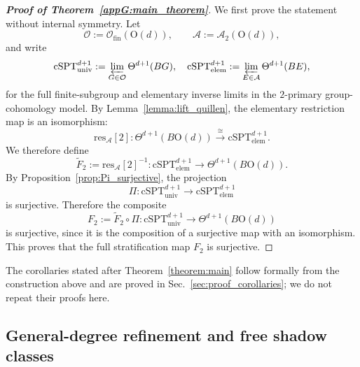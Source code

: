 \documentclass[aps,prx,reprint,superscriptaddress,twocolumn,amsmath,amssymb,amsfonts, nofootinbib]{revtex4-2}
\newcommand{\res}{\text{res}}
\theoremstyle{apsstyle}
\begin{document}
\begin{proof}[\textnormal{\textbf{Proof of Theorem~\ref{appG:main_theorem}}}]
We first prove the statement without internal symmetry. Let
\begin{equation}
\mathcal O:=\mathcal O_{\mathrm{fin}}(\mathrm{O}(d)), \qquad \mathcal A:=\mathcal A_2(\mathrm{O}(d)),
\end{equation}
and write
\begin{equation}
\mathrm{cSPT}^{d+1}_{\mathrm{univ}} := \varprojlim_{G\in\mathcal O}\Theta^{d+1}(BG),
\quad
\mathrm{cSPT}^{d+1}_{\mathrm{elem}} := \varprojlim_{E\in\mathcal A}\Theta^{d+1}(BE),
\end{equation}
for the full finite-subgroup and elementary inverse limits in the $2$-primary group-cohomology model. By Lemma~\ref{lemma:lift_quillen}, the elementary restriction map is an isomorphism:
\begin{equation}
\res_{\mathcal A}[2]:
\Theta^{d+1}(B\mathrm{O}(d)) \xrightarrow{\;\cong\;} \mathrm{cSPT}^{d+1}_{\mathrm{elem}}.
\end{equation}
We therefore define
\begin{equation}
\widetilde F_2 := \res_{\mathcal A}[2]^{-1}:
\mathrm{cSPT}^{d+1}_{\mathrm{elem}} \longrightarrow \Theta^{d+1}(B\mathrm{O}(d)).
\end{equation}
By Proposition~\ref{prop:Pi_surjective}, the projection
\begin{equation}
\Pi: \mathrm{cSPT}^{d+1}_{\mathrm{univ}}
\longrightarrow \mathrm{cSPT}^{d+1}_{\mathrm{elem}}
\end{equation}
is surjective. Therefore the composite
\begin{equation}
F_2 := \widetilde F_2\circ \Pi:
\mathrm{cSPT}^{d+1}_{\mathrm{univ}} \longrightarrow \Theta^{d+1}(B\mathrm{O}(d))
\end{equation}
is surjective, since it is the composition of a surjective map with an isomorphism. This proves that the full stratification map $F_{2}$ is surjective.
\end{proof}

\noindent The corollaries stated after Theorem~\ref{theorem:main} follow formally from the construction above and are proved in Sec.~\ref{sec:proof_corollaries}; we do not repeat their proofs here.


\subsection{General-degree refinement and free shadow classes}
\label{app:free_shadow_refinement} 
\end{document}
